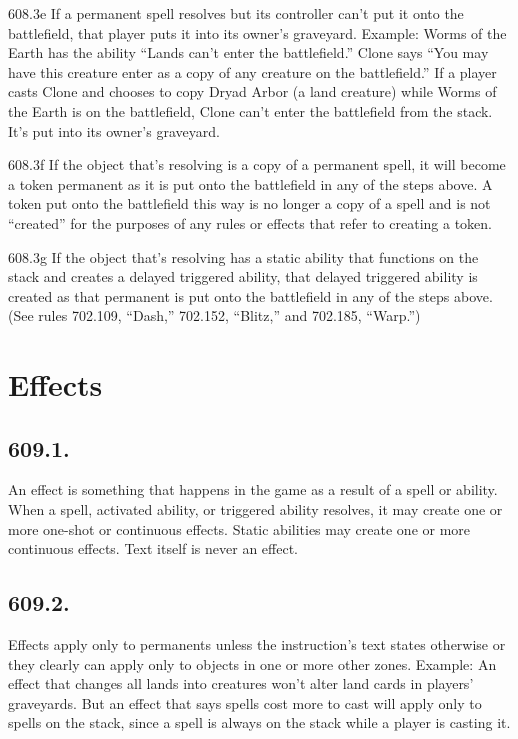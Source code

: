 608.3e If a permanent spell resolves but its controller can’t put it onto the battlefield, that player puts it into its owner’s graveyard.
Example: Worms of the Earth has the ability “Lands can’t enter the battlefield.” Clone says “You may have this creature enter as a copy of any creature on the battlefield.” If a player casts Clone and chooses to copy Dryad Arbor (a land creature) while Worms of the Earth is on the battlefield, Clone can’t enter the battlefield from the stack. It’s put into its owner’s graveyard.

608.3f If the object that’s resolving is a copy of a permanent spell, it will become a token permanent as it is put onto the battlefield in any of the steps above. A token put onto the battlefield this way is no longer a copy of a spell and is not “created” for the purposes of any rules or effects that refer to creating a token.

608.3g If the object that’s resolving has a static ability that functions on the stack and creates a delayed triggered ability, that delayed triggered ability is created as that permanent is put onto the battlefield in any of the steps above. (See rules 702.109, “Dash,” 702.152, “Blitz,” and 702.185, “Warp.”)

\section{Effects}
\subsection*{609.1.}
An effect is something that happens in the game as a result of a spell or ability. When a spell, activated ability, or triggered ability resolves, it may create one or more one-shot or continuous effects. Static abilities may create one or more continuous effects. Text itself is never an effect.

\subsection*{609.2.}
Effects apply only to permanents unless the instruction’s text states otherwise or they clearly can apply only to objects in one or more other zones.
Example: An effect that changes all lands into creatures won’t alter land cards in players’ graveyards. But an effect that says spells cost more to cast will apply only to spells on the stack, since a spell is always on the stack while a player is casting it.

